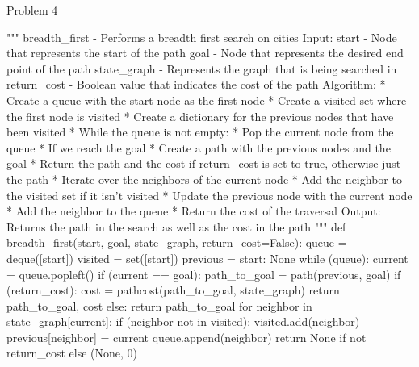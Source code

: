 \begin{problem}{Problem 4}
\begin{highlight}[Solution]
\begin{code}[Python]
    
    """ breadth_first - Performs a breadth first search on cities
        Input:
            start - Node that represents the start of the path
            goal - Node that represents the desired end point of the path
            state_graph - Represents the graph that is being searched in
            return_cost - Boolean value that indicates the cost of the path
        Algorithm:
            * Create a queue with the start node as the first node
            * Create a visited set where the first node is visited
            * Create a dictionary for the previous nodes that have been visited
            * While the queue is not empty:
                * Pop the current node from the queue
                * If we reach the goal
                    * Create a path with the previous nodes and the goal
                    * Return the path and the cost if return_cost is set to true, otherwise just the path
                * Iterate over the neighbors of the current node
                * Add the neighbor to the visited set if it isn't visited
                * Update the previous node with the current node
                * Add the neighbor to the queue
            * Return the cost of the traversal
        Output:
            Returns the path in the search as well as the cost in the path
    """
    def breadth_first(start, goal, state_graph, return_cost=False):
        queue = deque([start])
        visited = set([start])
        previous = {start: None}
        while (queue):
            current = queue.popleft()
            if (current == goal):
                path_to_goal = path(previous, goal)
                if (return_cost):
                    cost = pathcost(path_to_goal, state_graph)
                    return path_to_goal, cost
                else:
                    return path_to_goal
            for neighbor in state_graph[current]:
                if (neighbor not in visited):
                    visited.add(neighbor)
                    previous[neighbor] = current
                    queue.append(neighbor)
        return None if not return_cost else (None, 0)
    

\end{code}
\end{highlight}
\end{problem}
